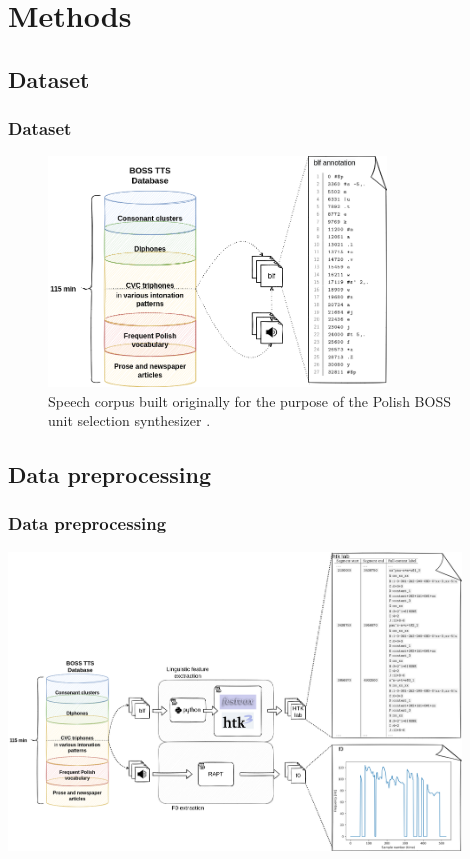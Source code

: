 \documentclass[a4paper,9pt]{beamer}
\theoremstyle{mytheoremstyle}
\begin{document}
\section{Methods}

\subsection{Dataset}


\begin{frame}
\frametitle{Dataset}
\begin{figure}
\begin{center}
  \includegraphics[width=0.8\textwidth]{res/dataset_blf}
\end{center}
	\caption{Speech corpus built originally for the purpose of the Polish BOSS unit selection synthesizer \parencite{demenko2007, demenko2008, demenko2010a, demenko2010b}.}
\end{figure}
\end{frame}


\subsection{Data preprocessing}

\begin{frame}
\frametitle{Data preprocessing}
\begin{center}
  \includegraphics[width=0.9\textwidth]{res/dataset_preprocessing}
\end{center}
\end{frame}
\end{document}
